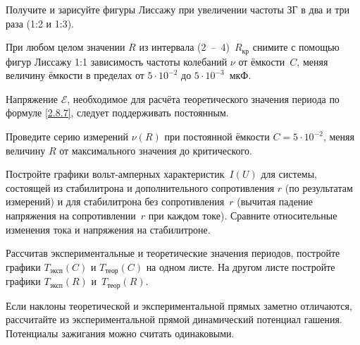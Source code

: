 \begin{lab:task}
Получите и зарисуйте фигуры Лиссажу при увеличении частоты ЗГ в два и три раза
(1:2 и 1:3).

		\item При любом целом значении $R$ из интервала (2~--~4)~$R_{\text{кр}}$
снимите с помощью фигур Лиссажу 1:1 зависимость частоты
колебаний $\nu$ от ёмкости~$C$, меняя величину ёмкости в пределах от
$5\cdot10^{-2}$ до $5\cdot10^{-3}$~мкФ.

Напряжение $\mathcal{E}$, необходимое для расчёта теоретического значения периода по
формуле \eqref{2.8.7}, следует поддерживать
постоянным.

		\item Проведите серию измерений $\nu(R)$ при постоянной ёмкости 
$C=5\cdot10^{-2}$, меняя величину $R$ от максимального
значения до критического.


		\item Постройте графики вольт-амперных характеристик~$I(U)$ для системы, 
        состоящей из стабилитрона и дополнительного сопротивления $r$ 
        (по результатам измерений) и 
        для стабилитрона без сопротивления~$r$ (вычитая падение напряжения
на сопротивлении~$r$ при каждом токе).
Сравните относительные изменения тока и напряжения на стабилитроне.

		\item Рассчитав экспериментальные и теоретические значения периодов,
постройте графики $T_{\text{эксп}}(C)$ и $T_{\text{теор}}(C)$ на
одном листе. На другом листе постройте графики $T_{\text{эксп}}(R)$ и~$T_{\text{теор}}(R)$.

		\item Если наклоны теоретической и экспериментальной прямых заметно
отличаются, рассчитайте из экспериментальной прямой
динамический потенциал гашения. Потенциалы зажигания можно считать одинаковыми.
\end{lab:task}


